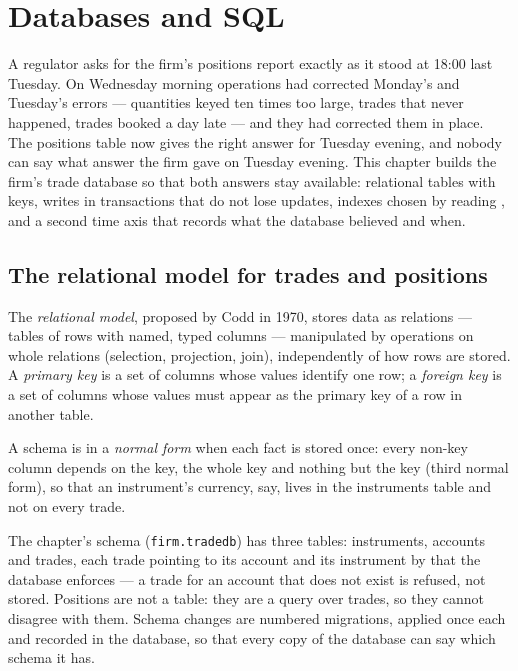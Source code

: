 \chapter{Databases and SQL}\label{ch:pl:databases-and-sql}

A regulator asks for the firm's positions report exactly as it stood at 18:00 last Tuesday. On Wednesday morning operations had corrected
Monday's and Tuesday's errors --- quantities keyed ten times too large, trades that never happened, trades booked a day late --- and they
had corrected them in place. The positions table now gives the right answer for Tuesday evening, and nobody can say what answer the firm gave
on Tuesday evening. This chapter builds the firm's trade database so that both answers stay available: relational tables with keys, writes in
transactions that do not lose updates, indexes chosen by reading , and a second time axis that records what the database believed
and when.

\section{The relational model for trades and positions}

\begin{definition}\label{def:pl:databases-and-sql:relational}
The \emph{relational model}, proposed by Codd in 1970, stores data as relations --- tables of rows with named, typed
columns --- manipulated by operations on whole relations (selection, projection, join), independently of how rows are stored. A \emph{primary
key} is a set of columns whose values identify one row; a \emph{foreign key} is a set of columns whose
values must appear as the primary key of a row in another table.
\end{definition}

\begin{definition}\label{def:pl:databases-and-sql:normal}
A schema is in a \emph{normal form} when each fact is stored once: every non-key column depends on the key, the whole key
and nothing but the key (third normal form), so that an instrument's currency, say, lives in the instruments table and not on every trade.
\end{definition}

The chapter's schema (\texttt{firm.tradedb}) has three tables: instruments, accounts and trades, each trade pointing to its account and its
instrument by  that the database enforces --- a trade for an account that does not exist is refused, not stored. Positions are
not a table: they are a query over trades, so they cannot disagree with them. Schema changes are numbered migrations, applied once each and
recorded in the database, so that every copy of the database can say which schema it has.

